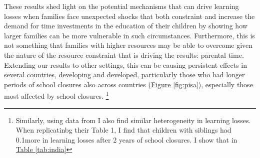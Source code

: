 These results shed light on the potential mechanisms that can drive learning losses when families face unexpected shocks that both constraint and increase the demand for time investments in the education of their children by showing how larger families can be more vulnerable in such circumstances. Furthermore, this is not something that families with higher resources may be able to overcome given the nature of the resource constraint that is driving the results: parental time. Extending our results to other settings, this can be causing persistent effects in several countries, developing and developed, particularly those who had longer periods of school closures also across countries (\hyperref[fig:pisa]{Figure \ref{fig:pisa}}), especially those most affected by school closures. \footnote{Similarly, using data from \cite{singh_covid-19_2022} I also find similar heterogeneity in learning losses. When replicatinbg their Table 1, I find that children with siblings had 0.1\sigma more in learning losses after 2 years of school closures. I show that in \hyperref[tab:india]{Table \ref{tab:india}}}


